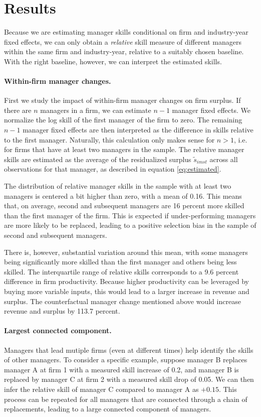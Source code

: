 \documentclass[11pt,a4paper]{article}
\begin{document}
\section{Results}

Because we are estimating manager skills conditional on firm and industry-year fixed effects, we can only obtain a \emph{relative} skill measure of different managers within the same firm and industry-year, relative to a suitably chosen baseline. With the right baseline, however, we can interpret the estimated skills.

\paragraph{Within-firm manager changes.}
First we study the impact of within-firm manager changes on firm surplus. If there are $n$ managers in a firm, we can estimate $n-1$ manager fixed effects. We normalize the log skill of the first manager of the firm to zero. The remaining $n-1$ manager fixed effects are then interpreted as the difference in skills relative to the first manager. Naturally, this calculation only makes sense for $n>1$, i.e. for firms that have at least two managers in the sample. The relative manager skills are estimated as the average of the residualized surplus $\tilde s_{imst}$ across all observations for that manager, as described in equation \eqref{eq:estimated}. 

The distribution of relative manager skills in the sample with at least two managers is centered a bit higher than zero, with a mean of 0.16. This means that, on average, second and subsequent managers are 16 percent more skilled than the first manager of the firm. This is expected if under-performing managers are more likely to be replaced, leading to a positive selection bias in the sample of second and subsequent managers. 

There is, however, substantial variation around this mean, with some managers being significantly more skilled than the first manager and others being less skilled. The interquartile range of relative skills corresponds to a 9.6 percent difference in firm productivity. Because higher productivity can be leveraged by buying more variable inputs, this would lead to a larger increase in revenue and surplus. The counterfactual manager change mentioned above would increase revenue and surplus by 113.7 percent.


\paragraph{Largest connected component.}
Managers that lead mutiple firms (even at different times) help identify the skills of other managers. To consider a specific example, suppose manager B replaces manager A at firm 1 with a measured skill increase of 0.2, and manager B is replaced by manager C at firm 2 with a measured skill drop of 0.05. We can then infer the relative skill of manager C compared to manager A as $+0.15$. This process can be repeated for all managers that are connected through a chain of replacements, leading to a large connected component of managers.
\end{document}
